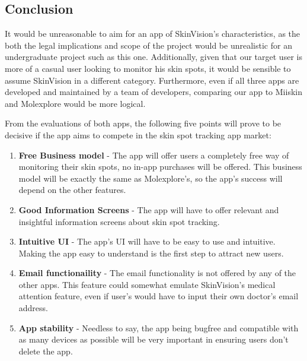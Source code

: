 \subsection{Conclusion}
It would be unreasonable to aim for an app of SkinVision's characteristics, as the both the legal implications and scope of the project would be unrealistic for an undergraduate project such as this one. Additionally, given that our target user is more of a casual user looking to monitor his skin spots, it would be sensible to assume SkinVision in a different category. Furthermore, even if all three apps are developed and maintained by a team of developers, comparing our app to Miiskin and Molexplore would be more logical.

From the evaluations of both apps, the following five points will prove to be decisive if the app aims to compete in the skin spot tracking app market:
\begin{enumerate}
    \item \textbf{Free Business model} - The app will offer users a completely free way of monitoring their skin spots, no in-app purchases will be offered. This business model will be exactly the same as Molexplore's, so the app's success will depend on the other features.
    \item \textbf{Good Information Screens} - The app will have to offer relevant and insightful information screens about skin spot tracking.
    \item \textbf{Intuitive UI} - The app's UI will have to be easy to use and intuitive. Making the app easy to understand is the first step to attract new users.
    \item \textbf{Email functionaility} - The email functionality is not offered by any of the other apps. This feature could somewhat emulate SkinVision's medical attention feature, even if user's would have to input their own doctor's email address.
    \item \textbf{App stability} - Needless to say, the app being bugfree and compatible with as many devices as possible will be very important in ensuring users don't delete the app.
\end{enumerate}

